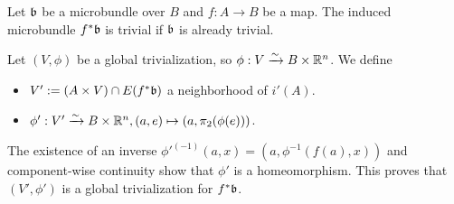 \begin{mylemma}\label{induced::trivial}
    Let $\mathfrak{b}$ be a microbundle over $B$ and $f: A \to B$ be a map.
    The induced microbundle $f^*\mathfrak{b}$ is trivial if $\mathfrak{b}$ is already trivial.
\end{mylemma}
\begin{myproof}
Let $(V, \phi)$ be a global trivialization, so $\phi: V \xrightarrow{\sim} B \times \mathbb{R}^n$.
We define
\begin{itemize}
    \item $V' := (A \times V) \cap E(f^*\mathfrak{b})$ a neighborhood of $i'(A)$.
    \item $\phi': V' \xrightarrow{\sim} B \times \mathbb{R}^n, (a, e) \mapsto (a, \pi_2(\phi(e)))$.
\end{itemize}
The existence of an inverse $\phi'^{(-1)}(a, x) = (a, \phi^{-1}(f(a), x))$ and component-wise continuity show that $\phi'$ is a homeomorphism.
This proves that $(V', \phi')$ is a global trivialization for $f^*\mathfrak{b}$. 
\end{myproof}